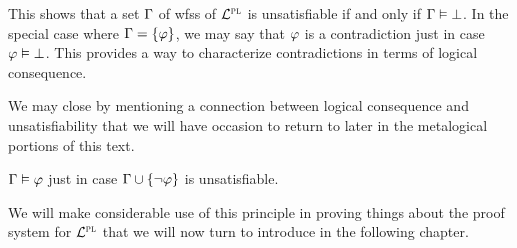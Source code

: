 This shows that a set $\Gamma$ of wfss of $\mathcal{L}^{\textsc{pl}}$ is unsatisfiable if and only if $\Gamma \vDash \bot$.
In the special case where $\Gamma = \lbrace\varphi\rbrace$, we may say that $\varphi$ is a contradiction just in case $\varphi \vDash \bot$. 
This provides a way to characterize contradictions in terms of logical consequence.

We may close by mentioning a connection between logical consequence and unsatisfiability that we will have occasion to return to later in the metalogical portions of this text.

\begin{Lthm} \label{lemma:unsat_consequence}
  $\Gamma \vDash \varphi$ just in case $\Gamma \cup \lbrace\neg \varphi\rbrace$ is unsatisfiable. 
\end{Lthm}

We will make considerable use of this principle in proving things about the proof system for $\mathcal{L}^{\textsc{pl}}$ that we will now turn to introduce in the following chapter.






